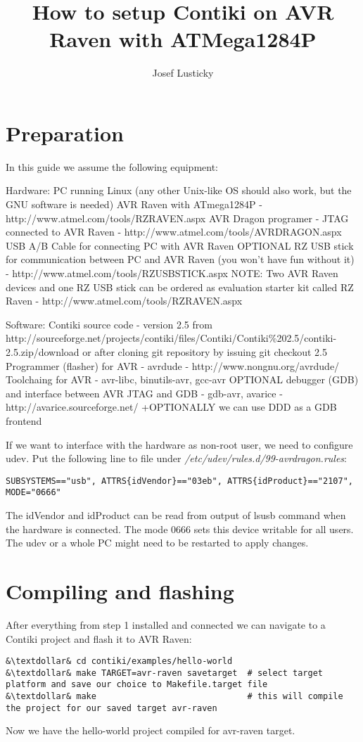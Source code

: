 \documentclass{article}
\begin{document}
\title{How to setup Contiki on AVR Raven with ATMega1284P}
\author{Josef Lusticky}

\maketitle

\section{Preparation}
In this guide we assume the following equipment:

Hardware:
PC running Linux (any other Unix-like OS should also work, but the GNU software is needed)
AVR Raven with ATmega1284P - http://www.atmel.com/tools/RZRAVEN.aspx
AVR Dragon programer - JTAG connected to AVR Raven - http://www.atmel.com/tools/AVRDRAGON.aspx
USB A/B Cable for connecting PC with AVR Raven
OPTIONAL RZ USB stick for communication between PC and AVR Raven (you won't have fun without it) - http://www.atmel.com/tools/RZUSBSTICK.aspx
NOTE: Two AVR Raven devices and one RZ USB stick can be ordered as evaluation starter kit called RZ Raven - http://www.atmel.com/tools/RZRAVEN.aspx




Software:
Contiki source code - version 2.5
	from\\
	http://sourceforge.net/projects/contiki/files/Contiki/Contiki\%202.5/contiki-2.5.zip/download
	or after cloning git repository by issuing git checkout 2.5
Programmer (flasher) for AVR - avrdude - http://www.nongnu.org/avrdude/
Toolchaing for AVR - avr-libc, binutils-avr, gcc-avr
OPTIONAL debugger (GDB) and interface between AVR JTAG and GDB - gdb-avr, avarice - http://avarice.sourceforge.net/
+OPTIONALLY we can use DDD as a GDB frontend


If we want to interface with the hardware as non-root user, we need to configure udev.
Put the following line to file under {\it{/etc/udev/rules.d/99-avrdragon.rules}}:
\begin{lstlisting}
SUBSYSTEMS=="usb", ATTRS{idVendor}=="03eb", ATTRS{idProduct}=="2107", MODE="0666"
\end{lstlisting}
The idVendor and idProduct can be read from output of lsusb command when the hardware is connected.
The mode 0666 sets this device writable for all users.
The udev or a whole PC might need to be restarted to apply changes.


\section{Compiling and flashing}
After everything from step 1 installed and connected we can navigate to a Contiki project and flash it to AVR Raven:
\begin{lstlisting}
&\textdollar& cd contiki/examples/hello-world
&\textdollar& make TARGET=avr-raven savetarget  # select target platform and save our choice to Makefile.target file
&\textdollar& make                              # this will compile the project for our saved target avr-raven
\end{lstlisting}
Now we have the hello-world project compiled for avr-raven target.
\end{document}
